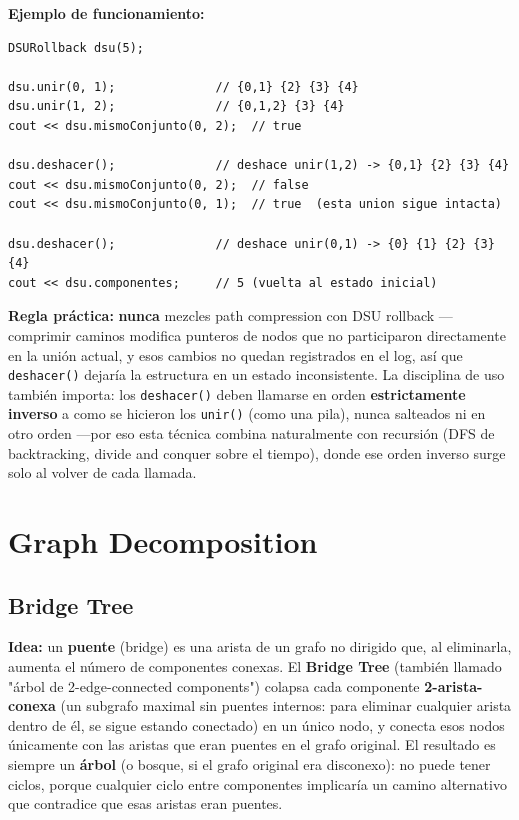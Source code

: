 \documentclass[10pt,a4paper,twocolumn]{article}
\begin{document}
\textbf{Ejemplo de funcionamiento:}

\begin{lstlisting}[style=cpp]
DSURollback dsu(5);

dsu.unir(0, 1);              // {0,1} {2} {3} {4}
dsu.unir(1, 2);              // {0,1,2} {3} {4}
cout << dsu.mismoConjunto(0, 2);  // true

dsu.deshacer();              // deshace unir(1,2) -> {0,1} {2} {3} {4}
cout << dsu.mismoConjunto(0, 2);  // false
cout << dsu.mismoConjunto(0, 1);  // true  (esta union sigue intacta)

dsu.deshacer();              // deshace unir(0,1) -> {0} {1} {2} {3} {4}
cout << dsu.componentes;     // 5 (vuelta al estado inicial)
\end{lstlisting}

\textbf{Regla práctica:} \textbf{nunca} mezcles path compression con
DSU rollback —comprimir caminos modifica punteros de nodos que no
participaron directamente en la unión actual, y esos cambios no
quedan registrados en el log, así que \texttt{deshacer()} dejaría la
estructura en un estado inconsistente. La disciplina de uso también
importa: los \texttt{deshacer()} deben llamarse en orden
\textbf{estrictamente inverso} a como se hicieron los \texttt{unir()}
(como una pila), nunca salteados ni en otro orden —por eso esta
técnica combina naturalmente con recursión (DFS de backtracking,
divide and conquer sobre el tiempo), donde ese orden inverso surge
solo al volver de cada llamada.


\section{Graph Decomposition}

\subsection{Bridge Tree}

\textbf{Idea:} un \textbf{puente} (bridge) es una arista de un grafo
no dirigido que, al eliminarla, aumenta el número de componentes
conexas. El \textbf{Bridge Tree} (también llamado "árbol de
2-edge-connected components") colapsa cada componente
\textbf{2-arista-conexa} (un subgrafo maximal sin puentes internos:
para eliminar cualquier arista dentro de él, se sigue estando
conectado) en un único nodo, y conecta esos nodos únicamente con las
aristas que eran puentes en el grafo original. El resultado es
siempre un \textbf{árbol} (o bosque, si el grafo original era
disconexo): no puede tener ciclos, porque cualquier ciclo entre
componentes implicaría un camino alternativo que contradice que esas
aristas eran puentes.
\end{document}
